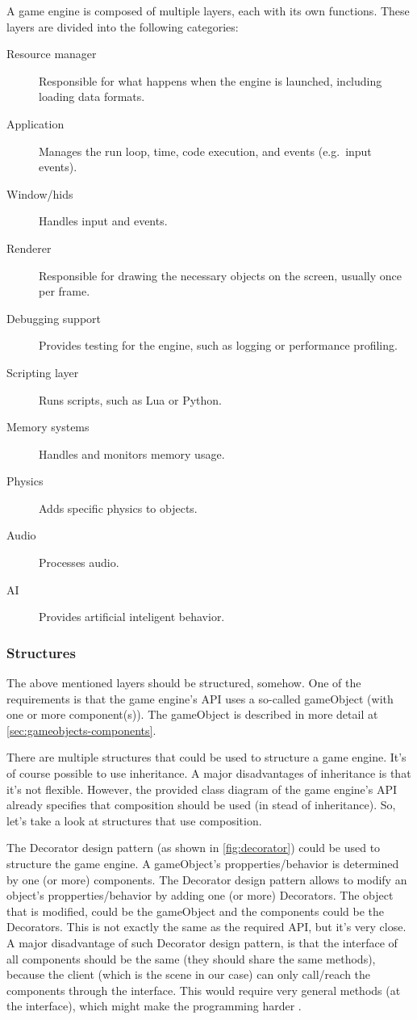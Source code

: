 \documentclass{projdoc}
\begin{document}
A game engine is composed of multiple layers, each with its own functions. These
layers are divided into the following categories:\noparbreak
\begin{description}
	\item[Resource manager] Responsible for what happens when the engine is launched,
		including loading data formats.
	\item[Application] Manages the run loop, time, code execution, and events
		(e.g.~input events).
	\item[Window/\glspl{hid}] Handles input and events.
	\item[Renderer] Responsible for drawing the necessary objects on the screen,
		usually once per frame.
	\item[Debugging support] Provides testing for the engine, such as logging or
		performance profiling.
	\item[Scripting layer] Runs scripts, such as Lua or Python.
	\item[Memory systems] Handles and monitors memory usage.
	\item[Physics] Adds specific physics to objects.
	\item[Audio] Processes audio.
	\item[AI] Provides artificial inteligent behavior.
\end{description}

\subsubsection{Structures}

The above mentioned layers should be structured, somehow. One of the requirements is
that the game engine's API uses a so-called gameObject (with one or more
component(s)). The gameObject is described in more detail at
\cref{sec:gameobjects-components}.

There are multiple structures that could be used to structure a game engine. It's of
course possible to use inheritance. A major disadvantages of inheritance is that it's
not flexible. However, the provided class diagram of the game engine's API already
specifies that composition should be used (in stead of inheritance). So, let's take a
look at structures that use composition.

The Decorator design pattern (as shown in \cref{fig:decorator}) could be used to
structure the game engine. A gameObject's propperties/behavior is determined by one
(or more) components. The Decorator design pattern allows to modify an object's
propperties/behavior by adding one (or more) Decorators. The object that is modified,
could be the gameObject and the components could be the Decorators. This is not
exactly the same as the required API, but it's very close. A major disadvantage of
such Decorator design pattern, is that the interface of all components should be the
same (they should share the same methods), because the client (which is the scene in
our case) can only call/reach the components through the interface. This would
require very general methods (at the interface), which might make the programming
harder \autocite{man:DecoratorDesignPattern}.
\end{document}
